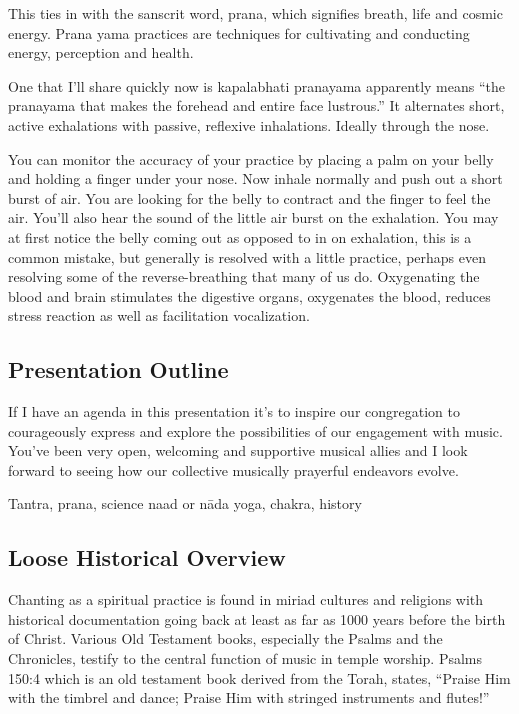 \documentclass[12pt]{article}
\begin{document}
This ties in with the sanscrit word, prana, which signifies breath, life and cosmic energy. Prana yama practices are techniques for cultivating and conducting energy, perception and health.

One that I'll share quickly now is kapalabhati pranayama apparently means “the pranayama that makes the forehead and entire face lustrous.” It alternates short, active exhalations with passive, reflexive inhalations. Ideally through the nose.

You can monitor the accuracy of your practice by placing a palm on your belly and holding a finger under your nose. Now inhale normally and push out a short burst of air. You are looking for the belly to contract and the finger to feel the air. You'll also hear the sound of the little air burst on the exhalation. You may at first notice the belly coming out as opposed to in on exhalation, this is a common mistake, but generally is resolved with a little practice, perhaps even resolving some of the reverse-breathing that many of us do. Oxygenating the blood and brain stimulates the digestive organs, oxygenates the blood, reduces stress reaction as well as facilitation vocalization.

\subsection*{Presentation Outline}

If I have an agenda in this presentation it's to inspire our congregation to courageously express and explore the possibilities of our engagement with music. You've been very open, welcoming and supportive musical allies and I look forward to seeing how our collective musically prayerful endeavors evolve.

Tantra, prana, science naad or nāda yoga, chakra, history

\subsection*{Loose Historical Overview}

Chanting as a spiritual practice is found in miriad cultures and religions with historical documentation going back at least as far as 1000 years before the birth of Christ. Various Old Testament books, especially the Psalms and the Chronicles, testify to the central function of music in temple worship. Psalms 150:4 which is an old testament book derived from the Torah, states, “Praise Him with the timbrel and dance; Praise Him with stringed instruments and flutes!”
\end{document}

